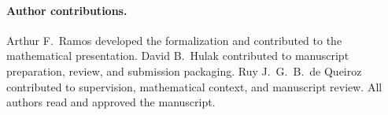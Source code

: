 \documentclass{birkjour}
\theoremstyle{plain}
\theoremstyle{definition}
\theoremstyle{remark}
\begin{document}
\paragraph{Author contributions.}
Arthur F.~Ramos developed the formalization and contributed to the mathematical
presentation. David B.~Hulak contributed to manuscript preparation, review, and
submission packaging. Ruy J.~G.~B.~de Queiroz contributed to supervision,
mathematical context, and manuscript review. All authors read and approved the
manuscript.

\begingroup
\raggedright


\endgroup
\end{document}

